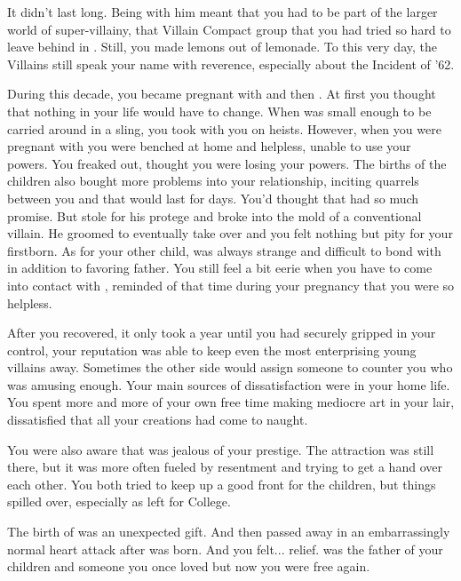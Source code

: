 \documentclass[char]{LRSguildcamp1}
\begin{document}
It didn't last long. Being with him meant that you had to be part of the larger world of super-villainy, that Villain Compact group that you had tried so hard to leave behind in \pSuperSchool{}. Still, you made lemons out of lemonade. To this very day, the Villains still speak your name with reverence, especially about the Incident of '62. 

During this decade, you became pregnant with \cOldest{} and then \cArchitect{}. At first you thought that nothing in your life would have to change. When \cOldest{} was small enough to be carried around in a sling, you took \cOldest{\them} with you on heists. However, when you were pregnant with \cArchitect{} you were benched at home and helpless, unable to use your powers. You freaked out, thought you were losing your powers. The births of the children also bought more problems into your relationship, inciting quarrels between you and \cGS{} that would last for days. You'd thought that \cOldest{} had so much promise. But \cGS{} stole \cOldest{} for his protege and broke \cOldest{} into the mold of a conventional villain. He groomed \cOldest{\them} to eventually take over \pCityO{} and you felt nothing but pity for your firstborn. As for your other child, \cArchitect{} was always strange and difficult to bond with in addition to favoring \cArchitect{} father. You still feel a bit eerie when you have to come into contact with \cArchitect{} , reminded of that time during your pregnancy that you were so helpless. 

After you recovered,  it only took a year until you had securely gripped \pCityGrandma{} in your control, your reputation was able to keep even the most enterprising young villains away. Sometimes the other side would assign someone to counter you who was amusing enough. Your main sources of dissatisfaction were in your home life. You spent more and more of your own free time making mediocre art in your lair, dissatisfied that all your creations had come to naught. 

You were also aware that \cGS{} was jealous of your prestige. The attraction was still there, but it was more often fueled by resentment and trying to get a hand over each other.  You both tried to keep up a good front for the children, but things spilled over, especially as \cOldest{} left for College. 

The birth of \cYoungest{} was an unexpected gift. And then \cGS{} passed away in an embarrassingly normal heart attack after \cYoungest{} was born. And you felt... relief. \cGS{} was the father of your children and someone you once loved but now you were free again. 
\end{document}
